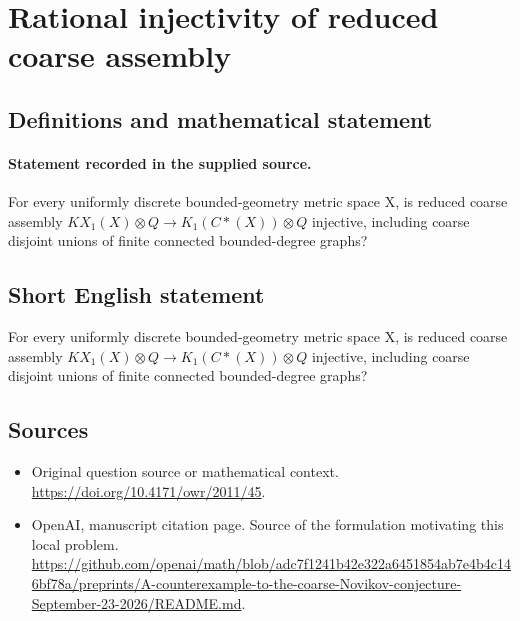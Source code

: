\documentclass[11pt]{article}
\begin{document}
\section*{Rational injectivity of reduced coarse assembly}\label{statement}
\subsection{Definitions and mathematical statement}
\paragraph{Statement recorded in the supplied source.}
For every uniformly discrete bounded-geometry metric space X, is reduced coarse assembly $KX_{1}(X)\otimes Q\to K_{1}(C*(X))\otimes Q$ injective, including coarse disjoint unions of finite connected bounded-degree graphs?
\subsection{Short English statement}
For every uniformly discrete bounded-geometry metric space X, is reduced coarse assembly $KX_{1}(X)\otimes Q\to K_{1}(C*(X))\otimes Q$ injective, including coarse disjoint unions of finite connected bounded-degree graphs?
\subsection{Sources}
\begin{itemize}
\item[S1] Original question source or mathematical context.
\url{https://doi.org/10.4171/owr/2011/45}.
\item[S2] OpenAI, manuscript citation page. Source of the formulation motivating this local problem.
\url{https://github.com/openai/math/blob/adc7f1241b42e322a6451854ab7e4b4c146bf78a/preprints/A-counterexample-to-the-coarse-Novikov-conjecture-September-23-2026/README.md}.
\end{itemize}
\end{document}
